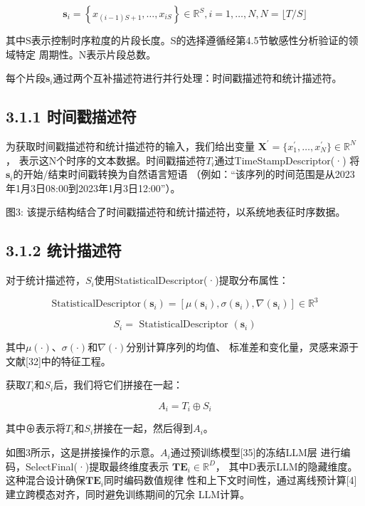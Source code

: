 \documentclass[
  10
]{article}
\begin{document}
\[
\mathbf {s} _ {i} = \left\{x _ {(i - 1) S + 1}, \dots , x _ {i S} \right\} \in \mathbb {R} ^ {S}, i = 1, \dots , N, N = \lfloor T / S \rfloor\tag{1}
\]

其中S表示控制时序粒度的片段长度。S的选择遵循经第4.5节敏感性分析验证的领域特定
周期性。N表示片段总数。

每个片段\(\mathbf{s}_{i}\)通过两个互补描述符进行并行处理：时间戳描述符和统计描述符。

\subsection{3.1.1 时间戳描述符}\label{timestamp-descriptor}

为获取时间戳描述符和统计描述符的输入，我们给出变量
\(\mathbf{X}^{\prime} = \{x_{1}^{\prime}, \ldots, x_{N}^{\prime}\} \in \mathbb{R}^{N}\)，
表示这N个时序的文本数据。时间戳描述符\(T_{i}\)通过TimeStampDescriptor(·)
将\(\mathbf{s}_{i}\)的开始/结束时间戳转换为自然语言短语
（例如：``该序列的时间范围是从2023年1月3日08:00到2023年1月3日12:00''）。

图3: 该提示结构结合了时间戳描述符和统计描述符，以系统地表征时序数据。

\subsection{3.1.2 统计描述符}\label{statistical-descriptor}

对于统计描述符，\(S_{i}\)使用StatisticalDescriptor(·)提取分布属性：

\[
\mathrm{StatisticalDescriptor} (\mathbf {s} _ {i}) = [ \mu (\mathbf {s} _ {i}), \sigma (\mathbf {s} _ {i}), \nabla (\mathbf {s} _ {i}) ] \in \mathbb {R} ^ {3}\tag{2}
\]

\[
S _ {i} = \text { StatisticalDescriptor } (\mathbf {s} _ {i})\tag{3}
\]

其中\(\mu(\cdot)\)、\(\sigma(\cdot)\)和\(\nabla(\cdot)\)分别计算序列的均值、
标准差和变化量，灵感来源于文献{[}32{]}中的特征工程。

获取\(T_{i}\)和\(S_{i}\)后，我们将它们拼接在一起：

\[
A _ {i} = T _ {i} \oplus S _ {i}\tag{4}
\]

其中⊕表示将\(T_{i}\)和\(S_{i}\)拼接在一起，然后得到\(A_{i}\)。

如图3所示，这是拼接操作的示意。\(A_{i}\)通过预训练模型{[}35{]}的冻结LLM层
进行编码，SelectFinal(·)提取最终维度表示
\(\mathbf{TE}_{i} \in \mathbb{R}^{D}\)，
其中D表示LLM的隐藏维度。这种混合设计确保\(\mathbf{TE}_{i}\)同时编码数值规律
性和上下文时间性，通过离线预计算{[}4{]}建立跨模态对齐，同时避免训练期间的冗余
LLM计算。
\end{document}
